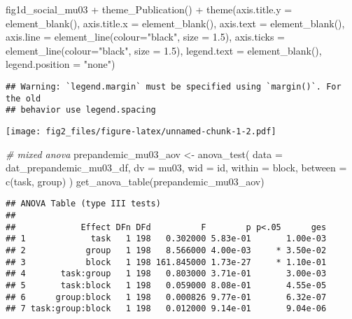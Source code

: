 \documentclass[
]{article}
\newenvironment{Shaded}{\begin{snugshade}}{\end{snugshade}}
\newcommand{\AttributeTok}[1]{\textcolor[rgb]{0.77,0.63,0.00}{#1}}
\newcommand{\CommentTok}[1]{\textcolor[rgb]{0.56,0.35,0.01}{\textit{#1}}}
\newcommand{\FloatTok}[1]{\textcolor[rgb]{0.00,0.00,0.81}{#1}}
\newcommand{\FunctionTok}[1]{\textcolor[rgb]{0.00,0.00,0.00}{#1}}
\newcommand{\NormalTok}[1]{#1}
\newcommand{\OtherTok}[1]{\textcolor[rgb]{0.56,0.35,0.01}{#1}}
\newcommand{\SpecialCharTok}[1]{\textcolor[rgb]{0.00,0.00,0.00}{#1}}
\newcommand{\StringTok}[1]{\textcolor[rgb]{0.31,0.60,0.02}{#1}}
\begin{document}
\begin{Shaded}
\begin{Highlighting}[]
\NormalTok{fig1d\_social\_mu03 }\SpecialCharTok{+} \FunctionTok{theme\_Publication}\NormalTok{() }\SpecialCharTok{+} \FunctionTok{theme}\NormalTok{(}\AttributeTok{axis.title.y =} \FunctionTok{element\_blank}\NormalTok{(),}
                                                \AttributeTok{axis.title.x =} \FunctionTok{element\_blank}\NormalTok{(),}
                                                \AttributeTok{axis.text =} \FunctionTok{element\_blank}\NormalTok{(), }
                                                \AttributeTok{axis.line =} \FunctionTok{element\_line}\NormalTok{(}\AttributeTok{colour=}\StringTok{"black"}\NormalTok{, }\AttributeTok{size =} \FloatTok{1.5}\NormalTok{),}
                                                \AttributeTok{axis.ticks =} \FunctionTok{element\_line}\NormalTok{(}\AttributeTok{colour=}\StringTok{"black"}\NormalTok{, }\AttributeTok{size =} \FloatTok{1.5}\NormalTok{),}
                                                \AttributeTok{legend.text =} \FunctionTok{element\_blank}\NormalTok{(),}
                                                \AttributeTok{legend.position =} \StringTok{"none"}\NormalTok{)}
\end{Highlighting}
\end{Shaded}

\begin{verbatim}
## Warning: `legend.margin` must be specified using `margin()`. For the old
## behavior use legend.spacing
\end{verbatim}

\texttt{[image: fig2\_files/figure-latex/unnamed-chunk-1-2.pdf]}

\begin{Shaded}
\begin{Highlighting}[]
\CommentTok{\# mixed anova}
\NormalTok{prepandemic\_mu03\_aov }\OtherTok{\textless{}{-}} \FunctionTok{anova\_test}\NormalTok{(}
  \AttributeTok{data =}\NormalTok{ dat\_prepandemic\_mu03\_df, }\AttributeTok{dv =}\NormalTok{ mu03, }\AttributeTok{wid =}\NormalTok{ id,}
  \AttributeTok{within =}\NormalTok{ block, }\AttributeTok{between =} \FunctionTok{c}\NormalTok{(task, group)}
\NormalTok{)}
\FunctionTok{get\_anova\_table}\NormalTok{(prepandemic\_mu03\_aov)}
\end{Highlighting}
\end{Shaded}

\begin{verbatim}
## ANOVA Table (type III tests)
## 
##             Effect DFn DFd          F        p p<.05      ges
## 1             task   1 198   0.302000 5.83e-01       1.00e-03
## 2            group   1 198   8.566000 4.00e-03     * 3.50e-02
## 3            block   1 198 161.845000 1.73e-27     * 1.10e-01
## 4       task:group   1 198   0.803000 3.71e-01       3.00e-03
## 5       task:block   1 198   0.059000 8.08e-01       4.55e-05
## 6      group:block   1 198   0.000826 9.77e-01       6.32e-07
## 7 task:group:block   1 198   0.012000 9.14e-01       9.04e-06
\end{verbatim}
\end{document}

